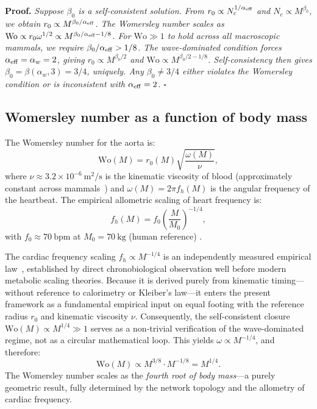\documentclass[11pt,a4paper]{article}
\theoremstyle{remark}
\begin{document}
\noindent\textbf{Proof.} \textit{Suppose $\beta_0$ is a self-consistent solution. From $r_0 \propto N_c^{1/\alpha_{\rm eff}}$ and $N_c \propto M^{\beta_0}$, we obtain $r_0 \propto M^{\beta_0/\alpha_{\rm eff}}$. The Womersley number scales as $\mathrm{Wo} \propto r_0 \omega^{1/2} \propto M^{\beta_0/\alpha_{\rm eff} - 1/8}$. For $\mathrm{Wo} \gg 1$ to hold across all macroscopic mammals, we require $\beta_0/\alpha_{\rm eff} > 1/8$. The wave-dominated condition forces $\alpha_{\rm eff} = \alpha_w = 2$, giving $r_0 \propto M^{\beta_0/2}$ and $\mathrm{Wo} \propto M^{\beta_0/2 - 1/8}$. Self-consistency then gives $\beta_0 = \beta(\alpha_w, 3) = 3/4$, uniquely. Any $\beta_0 \neq 3/4$ either violates the Womersley condition or is inconsistent with $\alpha_{\rm eff} = 2$. $\square$}

\subsection{Womersley number as a function of body mass}

The Womersley number for the aorta is:
\begin{equation}
\mathrm{Wo}(M) = r_0(M)\sqrt{\frac{\omega(M)}{\nu}},
\end{equation}
where $\nu \approx 3.2 \times 10^{-6}~\mathrm{m^2/s}$ is the kinematic viscosity
of blood (approximately constant across mammals~\cite{windberger2003}) and
$\omega(M) = 2\pi f_h(M)$ is the angular frequency of the heartbeat. The
empirical allometric scaling of heart frequency is:
\begin{equation}
f_h(M) = f_0 \left(\frac{M}{M_0}\right)^{-1/4},
\end{equation}
with $f_0 \approx 70~\mathrm{bpm}$ at $M_0 = 70~\mathrm{kg}$ (human reference)
\cite{peters1983}.

The cardiac frequency scaling $f_h \propto M^{-1/4}$ is an
independently measured empirical law~\cite{peters1983,calder1968},
established by direct chronobiological observation well before modern
metabolic scaling theories. Because it is derived purely from
kinematic timing---without reference to calorimetry or Kleiber's
law---it enters the present framework as a fundamental empirical
input on equal footing with the reference radius $r_0$ and kinematic
viscosity $\nu$. Consequently, the self-consistent closure
$\mathrm{Wo}(M) \propto M^{1/4} \gg 1$
serves as a non-trivial verification of the wave-dominated regime,
not as a circular mathematical loop.
This yields $\omega \propto M^{-1/4}$, and therefore:
\begin{equation}
\mathrm{Wo}(M) \propto M^{3/8} \cdot M^{-1/8} = M^{1/4}.
\end{equation}
The Womersley number scales as the \textit{fourth root of body mass}---a purely
geometric result, fully determined by the network topology and the allometry of
cardiac frequency.
\end{document}
